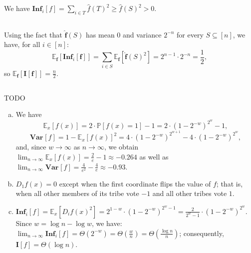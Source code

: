 \documentclass[12pt]{article}
\newcommand{\E}[2][]{\mathbb E_{#1}\left[#2\right]}
\renewcommand{\P}{\mathbb P}
\newcommand{\Inf}{\mathbf{Inf}}
\newcommand{\I}{\mathbf{I}}
\newcommand{\Var}[2]{\mathbf{Var}_{#1}\left[#2\right]}
\newcommand{\eqn}[1]{\begin{equation*}#1\end{equation*}}
\newcommand{\hf}{\widehat{f}}
\newcommand{\TODO}{{\color{red}TODO}}
\begin{document}
\subsection{}

\subsection{}
We have $\Inf_i[f] = \sum_{i \in T} \hf(T)^2 \geq \hf(S)^2 > 0$.

\subsection{}
Using the fact that $\mathbf{\hf}(S)$ has mean 0 and variance $2^{-n}$ for every $S \subseteq [n]$, we have, for all $i \in [n]$:
\eqn{\E[\mathbf{f}]{\Inf_i[\mathbf{f}]} = \sum_{i \in S} \E[\mathbf{f}]{\mathbf{\hf}(S)^2} = 2^{n-1} \cdot 2^{-n} = \frac1{2},}
so $\E[\mathbf{f}]{\I[\mathbf{f}]} = \frac{n}{2}$.

\subsection{}
\TODO
\begin{enumerate}[(a)]
    \item We have
          \eqn{\E[x]{f(x)} = 2 \cdot \P[f(x) = 1] - 1 = 2 \cdot (1 - 2^{-w})^{2^w} - 1,}%
          \eqn{\Var{}{f} = 1 - \E[x]{f(x)}^2 = 4 \cdot (1 - 2^{-w})^{2^{w + 1}} - 4 \cdot (1 - 2^{-w})^{2^w},}
          and, since $w \to \infty$ as $n \to \infty$, we obtain $\lim_{n \to \infty} \E[x]{f(x)} = \frac{2}{e} - 1 \approx -0.264$ as well as $\lim_{n \to \infty} \Var{}{f} = \frac{4}{e^2} - \frac{4}{e} \approx -0.93$.
          
    \item $D_1 f(x) = 0$ except when the first coordinate flips the value of $f$; that is, when all other members of its tribe vote $-1$ and all other tribes vote $1$.
    
    \item $\Inf_i[f] = \E[x]{D_i f(x)^2} = 2^{1-w} \cdot (1 - 2^{-w})^{2^w - 1} = \frac{2}{2^w - 1} \cdot (1 - 2^{-w})^{2^w}$. Since $w = \log n - \log w$, we have: $\lim_{n \to \infty} \Inf_i[f] = \Theta\left(2^{-w}\right) = \Theta\left(\frac{w}{n}\right) = \Theta\left(\frac{\log n}{n}\right)$; consequently, $\I[f] = \Theta(\log n)$.
\end{enumerate}

\subsection{}
\end{document}
